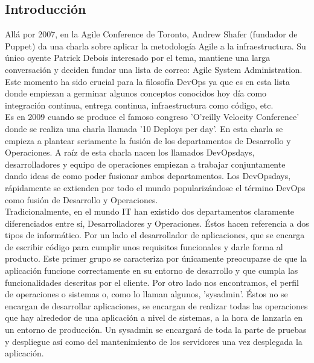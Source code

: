 	\subsection{Introducción}
	\begin{text}
		Allá por 2007, en la Agile Conference de Toronto, Andrew Shafer (fundador de Puppet) da una charla sobre aplicar la metodología Agile a la infraestructura. Su único oyente Patrick Debois interesado por el tema, mantiene una larga conversación y deciden fundar una lista de correo: Agile System Administration. Este momento ha sido crucial para la filosofía DevOps ya que es en esta lista donde empiezan a germinar algunos conceptos conocidos hoy día como integración continua, entrega continua, infraestructura como código, etc.\\
		Es en 2009 cuando se produce el famoso congreso  'O'reilly Velocity Conference' donde se realiza una charla llamada '10 Deploys per day'. En esta charla se empieza a plantear seriamente la fusión de los departamentos de Desarrollo y Operaciones. A raíz de esta charla nacen los llamados DevOpsdays, desarrolladores y equipo de operaciones empiezan a trabajar conjuntamente dando ideas de como poder fusionar ambos departamentos. Los DevOpsdays, rápidamente se extienden por todo el mundo popularizándose el término DevOps como fusión de Desarrollo y Operaciones. \\

		Tradicionalmente, en el mundo IT han existido dos departamentos claramente diferenciados entre sí, Desarrolladores y Operaciones. Éstos hacen referencia a dos tipos de informático. Por un lado el desarrollador de aplicaciones, que se encarga de escribir código para cumplir unos requisitos funcionales y darle forma al producto. Este primer grupo se caracteriza por únicamente preocuparse de que la aplicación funcione correctamente en su entorno de desarrollo y que cumpla las funcionalidades descritas por el cliente. Por otro lado nos encontramos, el perfil de operaciones o sistemas o, como lo llaman algunos, 'sysadmin'. Éstos no se encargan de desarrollar aplicaciones, se encargan de realizar todas las operaciones que hay alrededor de una aplicación a nivel de sistemas, a la hora de lanzarla en un entorno de producción. Un sysadmin se encargará de toda la parte de pruebas y despliegue así como del mantenimiento de los servidores una vez desplegada la aplicación. \\
		

\end{text}
